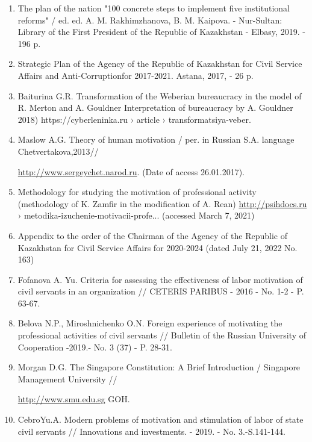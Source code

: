 \begin{enumerate}
\item
The plan of the nation "100 concrete steps to implement five
institutional reforms" / ed. ed. A. M. Rakhimzhanova, B. M. Kaipova. -
Nur-Sultan: Library of the First President of the Republic of Kazakhstan
- Elbasy, 2019. - 196 p.

\item
Strategic Plan of the Agency of the Republic of Kazakhstan for Civil
Service Affairs and Anti-Corruptionfor 2017-2021. Astana, 2017, - 26 p.

\item
Baiturina G.R. Transformation of the Weberian bureaucracy in the
model of R. Merton and A. Gouldner Interpretation of bureaucracy by A.
Gouldner 2018) https://cyberleninka.ru › article ›
transformatsiya-veber.

\item
Maslow A.G. Theory of human motivation / per. in Russian S.A.
language Chetvertakova,2013//

\href{http://www.sergeychet.narod.ru/bibl\_psy/hummotiv1943.htm}{http://www.sergeychet.narod.ru}. (Date of
access 26.01.2017).

\item
Methodology for studying the motivation of professional activity
(methodology of K. Zamfir in the modification of A.
Rean) \href{http://psihdocs.ru}{http://psihdocs.ru} › metodika-izuchenie-motivacii-profe...
(accessed March 7, 2021)

\item
Appendix to the order of the Chairman of the Agency of the Republic
of Kazakhstan for Civil Service Affairs for 2020-2024 (dated July 21,
2022 No. 163)

\item
Fofanova A. Yu. Criteria for assessing the effectiveness of labor
motivation of civil servants in an organization // CETERIS PARIBUS -
2016 - No. 1-2 - P. 63-67.

\item
Belova N.P., Miroshnichenko O.N. Foreign experience of motivating
the professional activities of civil servants // Bulletin of the Russian
University of Cooperation -2019.- No. 3 (37) - P. 28-31.

\item
Morgan D.G. The Singapore Constitution: A Brief Introduction /
Singapore Management University //

\href{http://www.smu.edu.sg/faculty/profile/9491/Jeremy-}{http://www.smu.edu.sg}
GOH.

\item
CebroYu.A. Modern problems of motivation and stimulation of labor of
state civil servants // Innovations and investments. - 2019. - No.
3.-S.141-144.
\end{enumerate}

